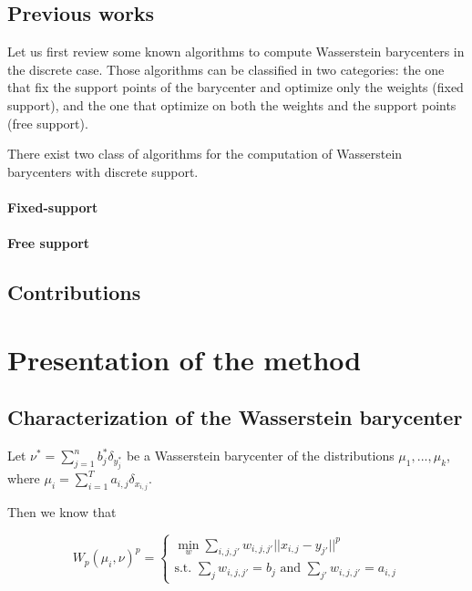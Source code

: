 \documentclass[11pt,a4paper]{article}
\begin{document}
\subsection{Previous works}

Let us first review some known algorithms to compute Wasserstein barycenters in the discrete case. Those algorithms can be classified in two categories: the one that fix the support points of the barycenter and optimize only the weights (fixed support), and the one that optimize on both the weights and the support points (free support).

There exist two class of algorithms for the computation of Wasserstein barycenters with discrete support.

\paragraph{Fixed-support} 

\paragraph{Free support} \cite{cuturi_fast_2014}

\subsection{Contributions}

\section{Presentation of the method}

\subsection{Characterization of the Wasserstein barycenter}

Let $\nu^* = \sum_{j=1}^n b^*_j \delta_{y^*_j}$ be a Wasserstein barycenter of the distributions $\mu_1, ..., \mu_k$, where $\mu_i = \sum_{i=1}^T a_{i, j} \delta_{x_{i, j}}$.

Then we know that 

$$W_p(\mu_i, \nu)^p = \begin{cases}
    \underset{w}{\min} \sum_{i, j, j'} w_{i,j,j'} ||x_{i, j} - y_{j'}||^p \\
    \text{s.t. } \sum_j w_{i,j,j'} = b_j \text{ and } \sum_{j'} w_{i,j,j'} = a_{i,j}
\end{cases}$$
\end{document}
